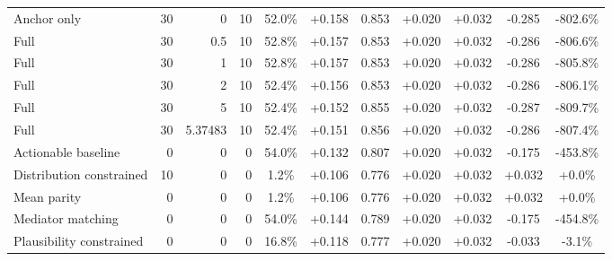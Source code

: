 \begin{table}[htbp]
\begin{tabular}{lrrrccccccc}
Anchor only & 30 & 0 & 10 & 52.0\% & +0.158 & 0.853 & +0.020 & +0.032 & -0.285 & -802.6\% \\
Full & 30 & 0.5 & 10 & 52.8\% & +0.157 & 0.853 & +0.020 & +0.032 & -0.286 & -806.6\% \\
Full & 30 & 1 & 10 & 52.8\% & +0.157 & 0.853 & +0.020 & +0.032 & -0.286 & -805.8\% \\
Full & 30 & 2 & 10 & 52.4\% & +0.156 & 0.853 & +0.020 & +0.032 & -0.286 & -806.1\% \\
Full & 30 & 5 & 10 & 52.4\% & +0.152 & 0.855 & +0.020 & +0.032 & -0.287 & -809.7\% \\
Full & 30 & 5.37483 & 10 & 52.4\% & +0.151 & 0.856 & +0.020 & +0.032 & -0.286 & -807.4\% \\
Actionable baseline & 0 & 0 & 0 & 54.0\% & +0.132 & 0.807 & +0.020 & +0.032 & -0.175 & -453.8\% \\
Distribution constrained & 10 & 0 & 0 & 1.2\% & +0.106 & 0.776 & +0.020 & +0.032 & +0.032 & +0.0\% \\
Mean parity & 0 & 0 & 0 & 1.2\% & +0.106 & 0.776 & +0.020 & +0.032 & +0.032 & +0.0\% \\
Mediator matching & 0 & 0 & 0 & 54.0\% & +0.144 & 0.789 & +0.020 & +0.032 & -0.175 & -454.8\% \\
Plausibility constrained & 0 & 0 & 0 & 16.8\% & +0.118 & 0.777 & +0.020 & +0.032 & -0.033 & -3.1\% \\
\bottomrule
\end{tabular}
\end{table}
